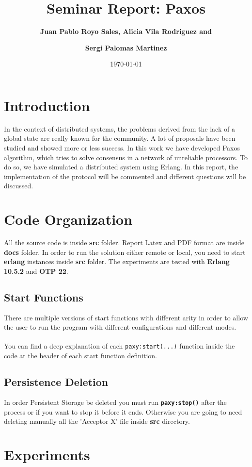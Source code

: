 \documentclass[a4paper, 10pt]{article}
\title{Seminar Report: Paxos}
\author{\textbf{Juan Pablo Royo Sales, Alicia Vila Rodriguez and} \\\and \textbf{Sergi Palomas Martinez}}
\date{\normalsize\today{}}
\begin{document}
\maketitle

\section{Introduction}

In the context of distributed systems, the problems derived from the lack of a global state are really known for the community. A lot of proposals have been studied and showed more or less success. In this work we have developed Paxos algorithm, which tries to solve consensus in a network of unreliable processors. To do so, we have simulated a distributed system using Erlang. In this report, the implementation of the protocol will be commented and different questions will be discussed.

\section{Code Organization}
All the source code is inside \textbf{src} folder. Report Latex and PDF format
are inside \textbf{docs} folder.
In order to run the solution either remote or local, you need to start
\textbf{erlang} instances inside \textbf{src} folder.
The experiments are tested with \textbf{Erlang 10.5.2} and \textbf{OTP 22}.
\subsection{Start Functions}
There are multiple versions of start functions with different arity in order to
allow the user to run the program with different configurations and different
modes.\\\\
You can find a deep explanation of each \lstinline|paxy:start(...)| function
inside the code at the header of each start function definition.

\subsection{Persistence Deletion}
In order Persistent Storage be deleted you must run
\textbf{\lstinline|paxy:stop()|} after the process or if you want to stop it
before it ends. Otherwise you are going to need deleting manually all the 'Acceptor X' file inside \textbf{src} directory.


\section{Experiments}
\end{document}
